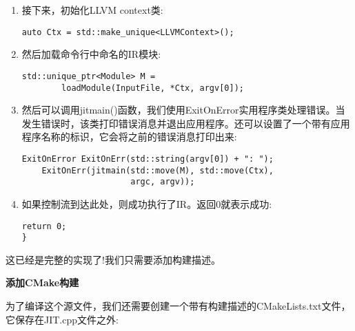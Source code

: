 \begin{enumerate}
\begin{lstlisting}[caption={}]
	InitializeNativeTarget();
	InitializeNativeTargetAsmPrinter();
	InitializeNativeTargetAsmParser();
	
	cl::ParseCommandLineOptions(argc, argv,
	     						"JIT\n");
\end{lstlisting}

\item 接下来，初始化LLVM context类:
\begin{lstlisting}[caption={}]
	auto Ctx = std::make_unique<LLVMContext>();
\end{lstlisting}

\item 然后加载命令行中命名的IR模块:
\begin{lstlisting}[caption={}]
	std::unique_ptr<Module> M =
		loadModule(InputFile, *Ctx, argv[0]);
\end{lstlisting}

\item 然后可以调用jitmain()函数，我们使用ExitOnError实用程序类处理错误。当发生错误时，该类打印错误消息并退出应用程序。还可以设置了一个带有应用程序名称的标识，它会将之前的错误消息打印出来:
\begin{lstlisting}[caption={}]
	ExitOnError ExitOnErr(std::string(argv[0]) + ": ");
	ExitOnErr(jitmain(std::move(M), std::move(Ctx),
					  argc, argv));
\end{lstlisting}

\item 如果控制流到达此处，则成功执行了IR。返回0就表示成功:
\begin{lstlisting}[caption={}]
	return 0;
}
\end{lstlisting}

\end{enumerate}

这已经是完整的实现了!我们只需要添加构建描述。 \par

\hspace*{\fill} \par %
\textbf{添加CMake构建}

为了编译这个源文件，我们还需要创建一个带有构建描述的CMakeLists.txt文件，它保存在JIT.cpp文件之外:\par

